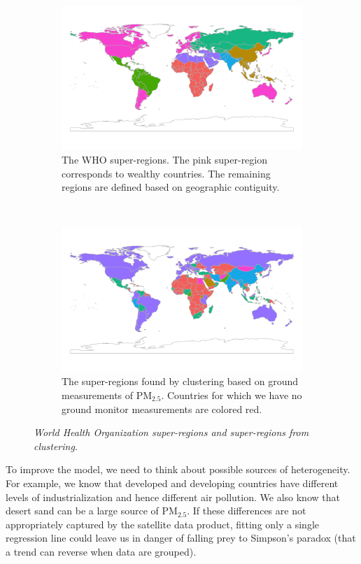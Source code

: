 \documentclass{statsoc}
\newcommand{\PM}{PM$_{2.5}$}
\begin{document}
\begin{figure}
\centering
\begin{subfigure}{0.45\textwidth}
\includegraphics[width=\textwidth]{map-who.png}
\caption{The WHO super-regions. The pink super-region corresponds to wealthy
countries. The remaining regions are defined based on geographic contiguity.}
\label{fig:whomap}
\end{subfigure}
~
\begin{subfigure}{0.45\textwidth}
\includegraphics[width=\textwidth]{map-clusters.png}
\caption{The super-regions found by clustering based on ground measurements of
\PM. Countries for which we have no ground monitor measurements are colored
red.}
\label{fig:clustermap}
\end{subfigure}
\caption{\it World Health Organization super-regions and super-regions from
clustering.}
\end{figure}

To improve the model, we need to think about possible sources of heterogeneity.
For example, we know that developed and developing countries have different
levels of industrialization and hence different air pollution.  We also know
that desert sand can be a large source of \PM.  If these differences are not
appropriately captured by the satellite data product, fitting only a single
regression line could leave us in danger of falling prey to Simpson's paradox
(that a trend can reverse when data are grouped).
\end{document}
